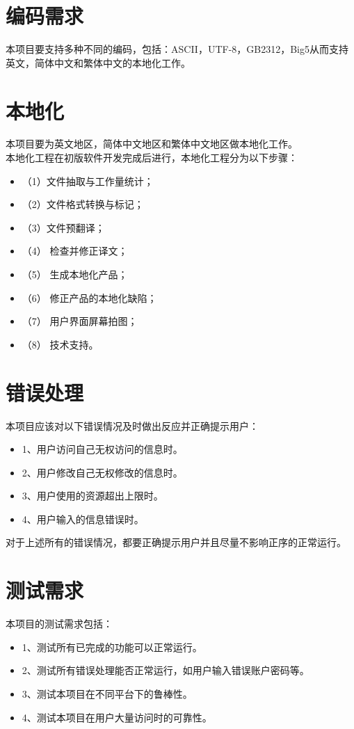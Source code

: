 \section{编码需求}
本项目要支持多种不同的编码，包括：ASCII，UTF-8，GB2312，Big5从而支持英文，简体中文和繁体中文的本地化工作。

\section{本地化}


本项目要为英文地区，简体中文地区和繁体中文地区做本地化工作。\\
本地化工程在初版软件开发完成后进行，本地化工程分为以下步骤：
\begin{itemize}
	\item\textbf{}（1）文件抽取与工作量统计；
	\item\textbf{}（2）文件格式转换与标记；
	\item\textbf{}（3）文件预翻译；
	\item\textbf{}（4） 检查并修正译文；
	\item\textbf{}（5） 生成本地化产品；
	\item\textbf{}（6） 修正产品的本地化缺陷；
	\item\textbf{}（7） 用户界面屏幕拍图；
	\item\textbf{}（8） 技术支持。
\end{itemize}


\section{错误处理}
	本项目应该对以下错误情况及时做出反应并正确提示用户：
	\begin{itemize}
		
	\item \textbf{}1、用户访问自己无权访问的信息时。
	\item \textbf{}	2、用户修改自己无权修改的信息时。
	\item \textbf{}3、用户使用的资源超出上限时。
	\item \textbf{}4、用户输入的信息错误时。
	\end{itemize}
	对于上述所有的错误情况，都要正确提示用户并且尽量不影响正序的正常运行。


\section{测试需求}
	本项目的测试需求包括：
\begin{itemize}
	
	\item \textbf{}1、测试所有已完成的功能可以正常运行。
	\item \textbf{}	2、测试所有错误处理能否正常运行，如用户输入错误账户密码等。
	\item \textbf{}	3、测试本项目在不同平台下的鲁棒性。
	\item \textbf{}4、测试本项目在用户大量访问时的可靠性。

\end{itemize}
	


